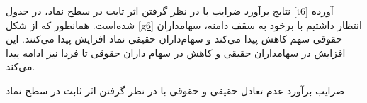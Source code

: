 \documentclass[12pt]{article}
\begin{document}
نتایج برآورد ضرایب با در نظر گرفتن اثر ثابت در سطح نماد، در جدول 
\ref{t6}
آورده شده‌است. همانطور که از شکل 
\ref{g6}
انتظار داشتیم با برخود به سقف دامنه، سهامداران حقوقی سهم کاهش پیدا می‌کند و سهام‌داران حقیقی نماد افزایش پیدا می‌کنند. 
این افزایش در سهامداران حقیقی و کاهش در سهام داران حقوقی تا فردا نیز ادامه پیدا می‌کند. 


\begin{table}[htbp]
\centering
\begin{LTR}
\lr{}
\end{LTR}
\caption{ضرایب برآورد عدم تعادل حقیقی و حقوقی با در نظر گرفتن اثر ثابت در سطح نماد}\label{t6}
\end{table}

\restoregeometry
\end{document}
